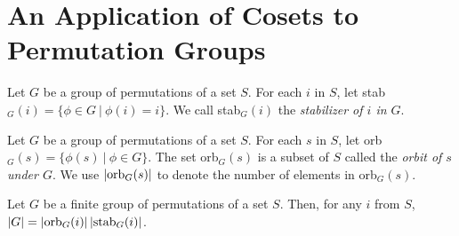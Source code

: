 \section{An Application of Cosets to Permutation Groups}

\begin{definition}
	Let $G$ be a group of permutations of a set $S$. For each $i$ in $S$, let stab$_G(i)=\{\phi \in G\ \vert\ \phi(i) = i\}$. We call stab$_G(i)$ the \textit{stabilizer of $i$ in $G$}.
\end{definition}

\begin{definition}
	Let $G$ be a group of permutations of a set $S$. For each $s$ in $S$, let orb$_G(s)=\{\phi(s)\ \vert\ \phi \in G\}$. The set orb$_G(s)$ is a subset of $S$ called the \textit{orbit of $s$ under $G$}. We use $\left\lvert \text{orb}_G(s) \right\rvert$ to denote the number of elements in orb$_G(s)$.
\end{definition}

\begin{theorem}
	Let $G$ be a finite group of permutations of a set $S$. Then, for any $i$ from $S$, $\left\lvert G \right\rvert = \left\lvert \text{orb}_G(i) \right\rvert\left\lvert \text{stab}_G(i) \right\rvert$.
\end{theorem}
